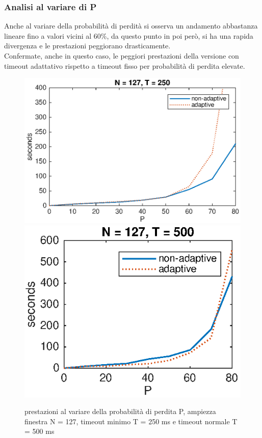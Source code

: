 \subsubsection {Analisi al variare di P}
Anche al variare della probabilità di perdità si osserva un andamento 
abbastanza lineare fino a valori vicini al 60\%, da questo punto in
poi però, si ha una rapida divergenza e le prestazioni peggiorano
drasticamente.\\
Confermate, anche in questo caso, le peggiori prestazioni della versione
con timeout adattativo rispetto a timeout fisso per probabilità di perdita
elevate.
\begin{figure}[!ht]
	\centering
	\includegraphics[scale=0.8]{images/P_N127_T250}
	\includegraphics[scale=0.8]{images/P_N127_T500}
	\caption{prestazioni al variare della probabilità di perdita P,
			 ampiezza finestra N = 127, timeout minimo T = 250 ms e 
			 timeout normale T = 500 ms}
\end{figure}
\newpage
